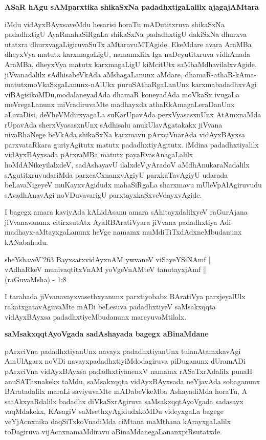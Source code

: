 {\bigskip
\noindent
{\large\bf ASaR hAgu sAMparxtika shikaSxNa padadhxtigaLalilx ajagajAMtara}}\label{page28}
\medskip

\noindent
iMdu vidAyxBAyxsaveMdu hesarisi horaTu mADutitxruva shikaSxNa padadhxtigU AyaR\-mahaSiRgaLa shikaSxNa padadhxtigU dakiSxNa dhurxva utatxra dhurxvagaLigiruvaSuTx aMtara\-vuMTA\-gide. EkeMdare avara AraMBa dheyxVya matutx karxmagaLigU, namamxlilx Iga naDeyu\-titxruva vidhAnada AraMBa, dheyxVya matutx karxmagaLigU kiMcitUtx\- saMbaMdhavilalxvAgide. jiVvanadalilx sAdhisabeVkAda aMshagaLanunx aMdare, dhamaR-athaR-kAma\--matutx\break moVkaSxgaLanunx-nAlUkx puruSAthaRgaLanUnx karxmabadadhxvAgi viBAgisikoMDu,\break modalaneyadAda dhamaR koneyadAda moVkaSx ivugaLa meVregaLanunx miVradiru\-vaMte madhayxda athaRkAmagaLeraDanUnx aLa\-vaDisi, deVheVMdirxyagaLa suKarUpavAda perxVyasasxnUnx AtAmxnaMda rUpavAda sherxVyasasxnUnx sAdhi\-salu anu\-kUla\-vAga\-takakx jiVvana nivaRhaNege beVkAda shikaSxNa karxmavu pArxciVnarAda vidAyxBAyxsa parxvataR\-kara guri\-yAgitutx matutx padadhxtiyAgitutx. iMdina padadhxtiyalilx vidAyxBAyxsada pArxraMBa matutx payaRvasAna\-gaLalilx hoMdANikeyilalxdeV, sadAshayavU ilalxdeV,\break yAradoV aMdhAnukaraNadalilx sAgutitxruvudariMda parxcaCx\-nanxvAgiyU parxkaTa\break\-vAgiyU uda\-rada beLavaNigeyeV muKayxvAgidudx mahaSiRgaLa sharxmavu mUleV\-pAlA\-giru\-vudu sAva\-dhAnavAgi noVDuvavarigU parxtayxkaSxveVdayxvAgide.

I bagegx amara kaviyAda kALidAsanu amara sAhitayxdalilxyeV raGurAjana jiVvanavanunx citirxsutAtx AyaRBAratiVyara jiVvana padadhxtiya Adi-madhayx-aMtayx\-gaLanunx heVge namamx muMdiTiTxdAdxneMbudanunx kANabahudu.

\medskip
\begin{shloka}
sheYshaveV\char'263 BayxsatxvidAyxnAM ywvaneV viSayeYSiNAmf |\\\label{28}
vAdhaRkeV munivaqtitxVnAM yoVgeVnAMteV tanutayxjAmf ||\\
\hfill (raGuvaMsha) - 1:8
\end{shloka}

I tarahada jiVvanavayxvasethxyanunx parxtiyobabx BAratiVya parxjeyalUlx rakatxgatavAguvaMte mADi beLe\-suva padadhxtiyeV saMsakxqqta vidAyxBAyxsa padadhxtiyeMbudanunx mareyuvaMtilalx.

{\bigskip
\noindent
{\large\bf saMsakxqqtAyoVgada sadAshayada bagegx aBinaMdane}}\label{page29b}
\medskip

\noindent
pArxciVna padadhxtiyanUnx navayx padadhxtiyanUnx tulanAtamxkavAgi AmUlAgarx noVDi navayxpadadhxtiyiM\-dodagiruva piDuganunx dUramADi pArxciVna vidAyxBAyxsa padadhxti\-yanenxV namamx rASaTxrXdalilx punaH anu\-SAThxnakekx taMdu, saMsakxqqta vidAyxBAyxsada neYjavAda sobaganunx BAratadalilx maraLi saviyuvaMte mADa\-beVkeMba
AshayadiMda horaTu, A satAkxyaRdalilx badadhx diVkaSxrAgiruva saMsakxqqtAyoVgada sadasayx vaqM\-dakekx, KAsagiV\- saMsethxyAgidudxkoMDu videyxgaLa bagege veYjAcnxnika daqSiTxkoVnadiMda ciMtana maMthana kArayx\-gaLalilx toDa\-giruva vijAcnxnamaMdiravu aBinaMdanegaLananxpiRsutatxde.

